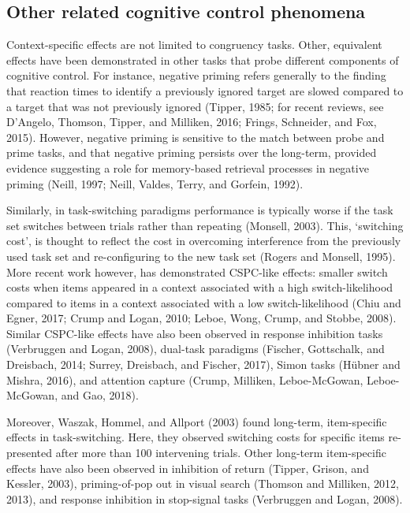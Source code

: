 \documentclass[]{DissertateCUNY}
\begin{document}
\hypertarget{other-related-cognitive-control-phenomena}{%
\subsection{Other related cognitive control
phenomena}\label{other-related-cognitive-control-phenomena}}

Context-specific effects are not limited to congruency tasks. Other,
equivalent effects have been demonstrated in other tasks that probe
different components of cognitive control. For instance, negative
priming refers generally to the finding that reaction times to identify
a previously ignored target are slowed compared to a target that was not
previously ignored (Tipper, 1985; for recent reviews, see D'Angelo,
Thomson, Tipper, and Milliken, 2016; Frings, Schneider, and Fox, 2015).
However, negative priming is sensitive to the match between probe and
prime tasks, and that negative priming persists over the long-term,
provided evidence suggesting a role for memory-based retrieval processes
in negative priming (Neill, 1997; Neill, Valdes, Terry, and Gorfein,
1992).

Similarly, in task-switching paradigms performance is typically worse if
the task set switches between trials rather than repeating (Monsell,
2003). This, `switching cost', is thought to reflect the cost in
overcoming interference from the previously used task set and
re-configuring to the new task set (Rogers and Monsell, 1995). More
recent work however, has demonstrated CSPC-like effects: smaller switch
costs when items appeared in a context associated with a high
switch-likelihood compared to items in a context associated with a low
switch-likelihood (Chiu and Egner, 2017; Crump and Logan, 2010; Leboe,
Wong, Crump, and Stobbe, 2008). Similar CSPC-like effects have also been
observed in response inhibition tasks (Verbruggen and Logan, 2008),
dual-task paradigms (Fischer, Gottschalk, and Dreisbach, 2014; Surrey,
Dreisbach, and Fischer, 2017), Simon tasks (Hübner and Mishra, 2016),
and attention capture (Crump, Milliken, Leboe-McGowan, Leboe-McGowan,
and Gao, 2018).

Moreover, Waszak, Hommel, and Allport (2003) found long-term,
item-specific effects in task-switching. Here, they observed switching
costs for specific items re-presented after more than 100 intervening
trials. Other long-term item-specific effects have also been observed in
inhibition of return (Tipper, Grison, and Kessler, 2003), priming-of-pop
out in visual search (Thomson and Milliken, 2012, 2013), and response
inhibition in stop-signal tasks (Verbruggen and Logan, 2008).
\end{document}
